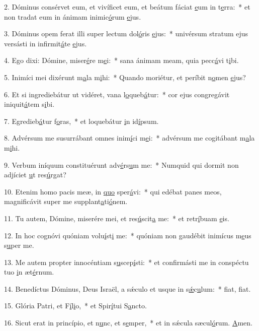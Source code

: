 2. Dóminus consérvet eum, et vivíficet eum, et beátum fáciat \uline{e}um in t\uline{e}rra:~* et non tradat eum in ánimam inimic\uline{ó}rum \uline{e}jus.\par 
3. Dóminus opem ferat illi super lectum dol\uline{ó}ris \uline{e}jus:~* univérsum stratum ejus versásti in infirmit\uline{á}te \uline{e}jus.\par 
4. Ego dixi: Dómine, miser\uline{é}re m\uline{e}i:~* sana ánimam meam, quia pecc\uline{á}vi t\uline{i}bi.\par 
5. Inimíci mei dixérunt m\uline{a}la m\uline{i}hi:~* Quando moriétur, et períbit n\uline{o}men \uline{e}jus?\par 
6. Et si ingrediebátur ut vidéret, vana l\uline{o}queb\uline{á}tur:~* cor ejus congregávit iniquit\uline{á}tem s\uline{i}bi.\par 
7. Egredieb\uline{á}tur f\uline{o}ras,~* et loquebátur \uline{i}n id\uline{í}psum.\par 
8. Advérsum me susurrábant omnes inim\uline{í}ci m\uline{e}i:~* advérsum me cogitábant m\uline{a}la m\uline{i}hi.\par 
9. Verbum iníquum constituérunt adv\uline{é}rs\uline{u}m me:~* Numquid qui dormit non adjíciet \uline{u}t res\uline{ú}rgat?\par 
10. Etenim homo pacis meæ, in \uline{quo} sper\uline{á}vi:~* qui edébat panes meos, magnificávit super me supplant\uline{a}ti\uline{ó}nem.\par 
11. Tu autem, Dómine, miserére mei, et res\uline{ú}scit\uline{a} me:~* et retr\uline{í}buam \uline{e}is.\par 
12. In hoc cognóvi quóniam volu\uline{í}st\uline{i} me:~* quóniam non gaudébit inimícus m\uline{e}us s\uline{u}per me.\par 
13. Me autem propter innocéntiam s\uline{u}scep\uline{í}sti:~* et confirmásti me in conspéctu tuo \uline{i}n æt\uline{é}rnum.\par 
14. Benedíctus Dóminus, Deus Israël, a sǽculo et usque in s\uline{ǽ}c\uline{u}lum:~* f\uline{i}at, f\uline{i}at.\par 
15. Glória Patri, et F\uline{í}l\uline{i}o,~* et Spir\uline{í}tui S\uline{a}ncto.\par 
16. Sicut erat in princípio, et n\uline{u}nc, et s\uline{e}mper,~* et in sǽcula sæcul\uline{ó}rum. \uline{A}men.\par 
